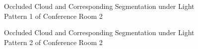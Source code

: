 \documentclass[11pt, a4paper,oneside,chapterprefix=false]{scrbook}
\begin{document}
\begin{figure}[H]
    \centering
      \label{fig:conf2 0 occluded} \hfill
     \label{fig:conf2 0 seg}
    \caption{Occluded Cloud and Corresponding Segmentation under Light Pattern 1 of Conference Room 2}
    \label{fig:conf2 0 occ and seg}
\end{figure}

\begin{figure}[H]
    \centering
      \label{fig:conf2 4 occluded} \hfill
     \label{fig:conf2 4 seg}
    \caption{Occluded Cloud and Corresponding Segmentation  under Light Pattern 2 of Conference Room 2}
    \label{fig:conf2 4 occ and seg}
\end{figure}
\end{document}
